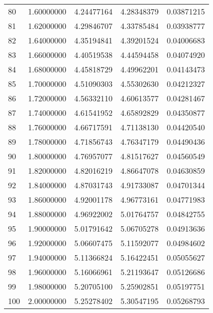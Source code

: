 \begin{tabular}{lrrrr}
80 & 1.60000000 & 4.24477164 & 4.28348379 & 0.03871215 \\
81 & 1.62000000 & 4.29846707 & 4.33785484 & 0.03938777 \\
82 & 1.64000000 & 4.35194841 & 4.39201524 & 0.04006683 \\
83 & 1.66000000 & 4.40519538 & 4.44594458 & 0.04074920 \\
84 & 1.68000000 & 4.45818729 & 4.49962201 & 0.04143473 \\
85 & 1.70000000 & 4.51090303 & 4.55302630 & 0.04212327 \\
86 & 1.72000000 & 4.56332110 & 4.60613577 & 0.04281467 \\
87 & 1.74000000 & 4.61541952 & 4.65892829 & 0.04350877 \\
88 & 1.76000000 & 4.66717591 & 4.71138130 & 0.04420540 \\
89 & 1.78000000 & 4.71856743 & 4.76347179 & 0.04490436 \\
90 & 1.80000000 & 4.76957077 & 4.81517627 & 0.04560549 \\
91 & 1.82000000 & 4.82016219 & 4.86647078 & 0.04630859 \\
92 & 1.84000000 & 4.87031743 & 4.91733087 & 0.04701344 \\
93 & 1.86000000 & 4.92001178 & 4.96773161 & 0.04771983 \\
94 & 1.88000000 & 4.96922002 & 5.01764757 & 0.04842755 \\
95 & 1.90000000 & 5.01791642 & 5.06705278 & 0.04913636 \\
96 & 1.92000000 & 5.06607475 & 5.11592077 & 0.04984602 \\
97 & 1.94000000 & 5.11366824 & 5.16422451 & 0.05055627 \\
98 & 1.96000000 & 5.16066961 & 5.21193647 & 0.05126686 \\
99 & 1.98000000 & 5.20705100 & 5.25902851 & 0.05197751 \\
100 & 2.00000000 & 5.25278402 & 5.30547195 & 0.05268793 \\
\end{tabular}

